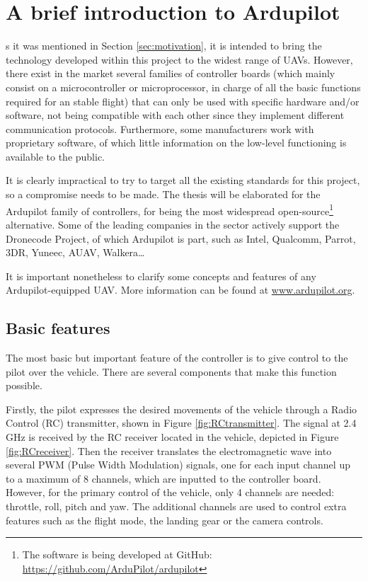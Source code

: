 
\let\textcircled=\pgftextcircled
\chapter{A brief introduction to Ardupilot} \label{chap:ardupilot}

s it was mentioned in Section \ref{sec:motivation}, it is intended to bring the technology developed within this project to the widest range of UAVs.
However, there exist in the market several families of controller boards (which mainly consist on a microcontroller or microprocessor, in charge of all the basic functions required for an stable flight) that can only be used with specific hardware and/or software, not being compatible with each other since they implement different communication protocols.
Furthermore, some manufacturers work with proprietary software, of which little information on the low-level functioning is available to the public.

It is clearly impractical to try to target all the existing standards for this project, so a compromise needs to be made.
The thesis will be elaborated for the Ardupilot family of controllers, for being the most widespread open-source\footnote{The software is being developed at GitHub: \url{https://github.com/ArduPilot/ardupilot}} alternative.
Some of the leading companies \cite{droneindustryinsights2016} in the sector actively support the Dronecode Project, of which Ardupilot is part, such as Intel, Qualcomm, Parrot, 3DR, Yuneec, AUAV, Walkera\ldots \cite{dronecode2016}

It is important nonetheless to clarify some concepts and features of any Ardupilot-equipped UAV.
More information can be found at \url{www.ardupilot.org}.

\section{Basic features} \label{sec:basics}

The most basic but important feature of the controller is to give control to the pilot over the vehicle.
There are several components that make this function possible.

Firstly, the pilot expresses the desired movements of the vehicle through a Radio Control (RC) transmitter, shown in Figure \ref{fig:RCtransmitter}.
The signal at 2.4 GHz is received by the RC receiver located in the vehicle, depicted in Figure \ref{fig:RCreceiver}.
Then the receiver translates the electromagnetic wave into several PWM (Pulse Width Modulation) signals, one for each input channel up to a maximum of 8 channels, which are inputted to the controller board.
However, for the primary control of the vehicle, only 4 channels are needed: throttle, roll, pitch and yaw.
The additional channels are used to control extra features such as the flight mode, the landing gear or the camera controls.

